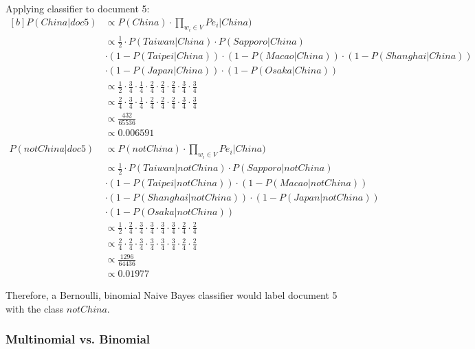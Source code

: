 \documentclass{article}
\begin{document}
Applying classifier to document 5:
\begin{equation}
\begin{aligned}[b]
	P(China|doc5) & \propto P(China) \cdot \prod_{w_i \in V} {Pe_i|China)} \\
	& \propto \frac{1}{2} \cdot P(Taiwan|China) \cdot P(Sapporo|China) \nonumber \\
	& \cdot (1 - P(Taipei|China)) \cdot (1 - P(Macao|China)) \cdot (1 - P(Shanghai|China)) \nonumber \\
	& \cdot (1 - P(Japan|China)) \cdot (1 - P(Osaka|China)) \\
	& \propto \frac{1}{2} \cdot \frac{3}{4} \cdot \frac{1}{4}
	\cdot \frac{2}{4} \cdot \frac{2}{4} \cdot \frac{2}{4}
	\cdot \frac{3}{4} \cdot \frac{3}{4} \\
	& \propto \frac{2}{4} \cdot \frac{3}{4} \cdot \frac{1}{4}
	\cdot \frac{2}{4} \cdot \frac{2}{4} \cdot \frac{2}{4}
	\cdot \frac{3}{4} \cdot \frac{3}{4} \\
	& \propto \frac{432}{65536} \\
	& \propto 0.006591 \\
	& \nonumber \\
	P(notChina|doc5) & \propto P(notChina) \cdot \prod_{w_i \in V} {Pe_i|China)} \\
	& \propto \frac{1}{2} \cdot P(Taiwan|notChina) \cdot P(Sapporo|notChina) \nonumber \\
	& \cdot (1 - P(Taipei|notChina)) \cdot (1 - P(Macao|notChina)) \nonumber \\
	& \cdot (1 - P(Shanghai|notChina)) \cdot (1 - P(Japan|notChina)) \nonumber \\
	& \cdot (1 - P(Osaka|notChina)) \\	
	& \propto \frac{1}{2} \cdot \frac{2}{4} \cdot \frac{3}{4} \cdot \frac{3}{4} \cdot \frac{3}{4} \cdot \frac{3}{4} \cdot \frac{2}{4} \cdot \frac{2}{4} \\
	& \propto \frac{2}{4} \cdot \frac{2}{4} \cdot \frac{3}{4} \cdot \frac{3}{4} \cdot \frac{3}{4} \cdot \frac{3}{4} \cdot \frac{2}{4} \cdot \frac{2}{4} \\
	& \propto \frac{1296}{64436} \\
	& \propto0.01977
\end{aligned}
\end{equation}

Therefore, a Bernoulli, binomial Naive Bayes classifier would label document 5 with the class $notChina$.

\subsubsection{Multinomial vs. Binomial}
\end{document}
